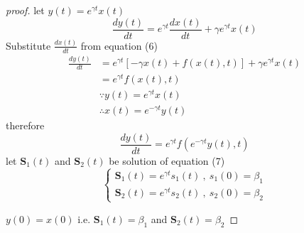 \documentclass[]{article}
\begin{document}
\begin{proof}[proof]

let $ y(t) = e^{\gamma t} x(t) $ 
\[
    \frac{dy(t)}{dt}  = e^{\gamma t}\frac{dx(t)}{dt} + \gamma e^{\gamma t}x(t)
\]
Substitute $\displaystyle \frac{dx(t)}{dt}$ from equation (6)
\begin{align*}
    \frac{dy(t)}{dt}  &= e^{\gamma t}\left[-\gamma x(t) + f(x(t),t)\right] + \gamma e^{\gamma t}x(t)
    \\
    &= e^{\gamma t}f(x(t),t)
    \\
    &\because y(t) = e^{\gamma t} x(t)
    \\
    &\therefore x(t) = e^{-\gamma t}y(t) 
\end{align*}
therefore
\begin{equation}
    \frac{dy(t)}{dt} = e^{\gamma t}f(e^{-\gamma t}y(t),t)
\end{equation}
let $\mathbf{S}_1(t)$ and $\mathbf{S}_2(t)$ be solution of equation (7)
\begin{equation}
    \begin{cases}
        \displaystyle \mathbf{S}_1(t) = e^{\gamma t}s_1(t) \ , \  s_1(0) = \beta_1 
        \\
        \displaystyle \mathbf{S}_2(t) = e^{\gamma t}s_2(t) \ , \  s_2(0) = \beta_2
    \end{cases}
\end{equation}

$y(0) = x(0)$ i.e. $\mathbf{S}_1(t) = \beta_1 $ and $\mathbf{S}_2(t) = \beta_2$


\end{proof}
\end{document}
